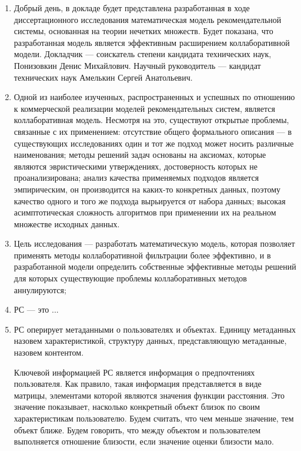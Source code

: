 \documentclass[a4paper,11pt]{proc}
\begin{document}
\scriptsize{
\begin{enumerate}

%
%

\item Добрый день, в докладе будет представлена разработанная в ходе диссертационного исследования
	математическая модель рекомендательной системы, основанная на теории нечетких
	множеств. Будет показана, что разработанная модель является эффективным расширением коллаборативной
	модели. Докладчик --- соискатель степени кандидата технических наук, Понизовкин Денис Михайлович.
	Научный руководитель --- кандидат технических наук Амелькин Сергей Анатольевич.

\item Одной из наиболее изученных, распространенных и успешных по отношению к коммерческой реализации
	моделей рекомендательных систем, является коллаборативная
	модель. Несмотря на это, существуют открытые
	проблемы, связанные с их применением: отсутствие общего формального
	описания --- в существующих исследованиях один и
	тот же подход может носить различные наименования;
	методы решений задач основаны на аксиомах, которые являются эвристическими утверждениях,
	достоверность которых не проанализирована;
	анализ качества применяемых подходов является
	эмпирическим, он производится на каких-то конкретных данных, поэтому
	качество одного и того же подхода вырьируется от набора данных;
	высокая асимптотическая сложность алгоритмов при применении их на реальном
	множестве исходных данных.

\item Цель исследования --- разработать математическую модель, которая
	позволяет применять методы коллаборативной фильтрации более эффективно,
	и в разработанной модели определить собственные эффективные методы решений
	для которых существующие проблемы коллаборативных методов аннулируются;

\item РС --- это ...

\item РС оперирует метаданными о пользователях и объектах. Единицу метаданных
	назовем характеристикой, структуру данных, представляющую метаданные, назовем
	контентом.

	Ключевой информацией РС является информация о предпочтениях пользователя.
	Как правило, такая информация представляется в виде матрицы, элементами
	которой являются значения функции расстояния. Это значение показывает,
	насколько конкретный объект близок по своим характеристикам пользователю.
	Будем считать, что чем меньше значение, тем объект ближе. Будем говорить,
		что между объектом и пользователем выполняется отношение близости,
		если значение оценки близости мало.


\end{enumerate}}
\end{document}
